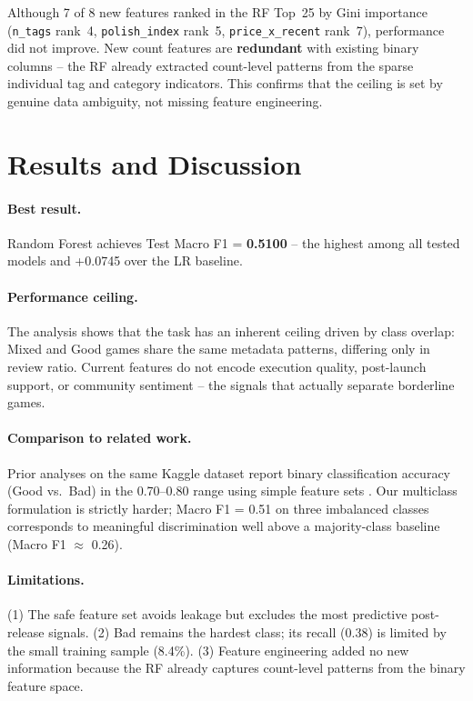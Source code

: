 \documentclass[11pt, a4paper]{article}
\newcommand{\ttf}[1]{\texttt{#1}}
\begin{document}
Although 7 of 8 new features ranked in the RF Top~25 by Gini importance
(\ttf{n\_tags} rank~4, \ttf{polish\_index} rank~5, \ttf{price\_x\_recent} rank~7),
performance did not improve.
New count features are \textbf{redundant} with existing binary columns -- the RF
already extracted count-level patterns from the sparse individual tag and category
indicators.
This confirms that the ceiling is set by genuine data ambiguity, not missing
feature engineering.

\section{Results and Discussion}
\label{sec:results}

\paragraph{Best result.}
Random Forest achieves Test Macro F1 = \textbf{0.5100} -- the highest among all
tested models and +0.0745 over the LR baseline.

\paragraph{Performance ceiling.}
The analysis shows that the task has an inherent ceiling driven by class overlap:
Mixed and Good games share the same metadata patterns, differing only in review ratio.
Current features do not encode execution quality, post-launch support, or community
sentiment -- the signals that actually separate borderline games.

\paragraph{Comparison to related work.}
Prior analyses on the same Kaggle dataset report binary classification accuracy
(Good vs.\ Bad) in the 0.70--0.80 range using simple feature sets \cite{fronkon2024}.
Our multiclass formulation is strictly harder; Macro F1 = 0.51 on three imbalanced
classes corresponds to meaningful discrimination well above a majority-class
baseline (Macro F1 $\approx$ 0.26).

\paragraph{Limitations.}
(1) The safe feature set avoids leakage but excludes the most predictive post-release
signals. (2) Bad remains the hardest class; its recall (0.38) is limited by the small
training sample (8.4\%). (3) Feature engineering added no new information because the
RF already captures count-level patterns from the binary feature space.
\end{document}
